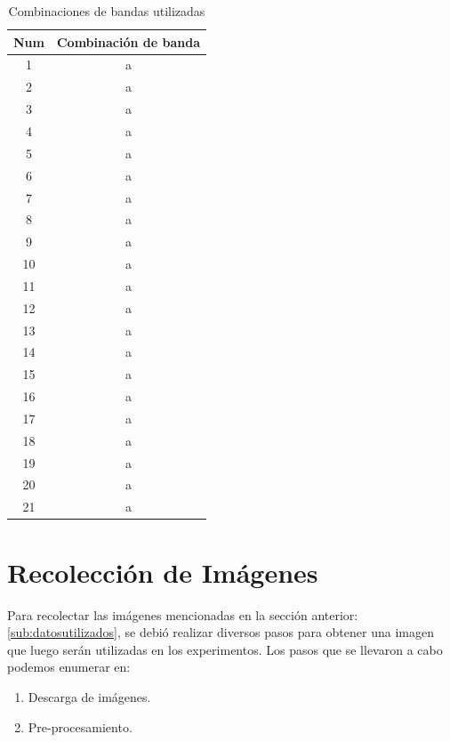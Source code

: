 \begin{table}[H] \begin{center}
\begin{tabular}{c|c}
Num & Combinación de banda\\ \hline 
		1  & a \\ 					 \hline
		2  & a \\ 					 \hline
    	3  & a \\ 					 \hline
		4  & a \\ 					 \hline
		5  & a \\ 					 \hline
    	6  & a \\ 					 \hline
		7  & a \\ 					 \hline
		8  & a \\ 					 \hline
    	9  & a \\ 					 \hline
		10 & a \\ 					 \hline
		11 & a \\ 					 \hline
    	12 & a \\ 					 \hline
		13 & a \\ 					 \hline
		14 & a \\ 					 \hline
    	15 & a \\ 					 \hline
		16 & a \\ 					 \hline
		17 & a \\ 					 \hline
    	18 & a \\ 					 \hline
		19 & a \\ 					 \hline
		20 & a \\ 					 \hline
    	21 & a \\ 					 \hline    	
\end{tabular}
\end{center}\caption{Combinaciones de bandas utilizadas \label{tab:combinacion_banda}}
\end{table}
\section{Recolección de Imágenes}\label{sub:recolecciondeimagen}

Para recolectar las imágenes mencionadas en la sección anterior: \ref{sub:datosutilizados}, se debió realizar diversos pasos para obtener una imagen que luego serán utilizadas en los experimentos. Los pasos que se llevaron a cabo podemos enumerar  en:
\begin{enumerate}
	\item Descarga de imágenes.
	\item Pre-procesamiento.
\end{enumerate}

